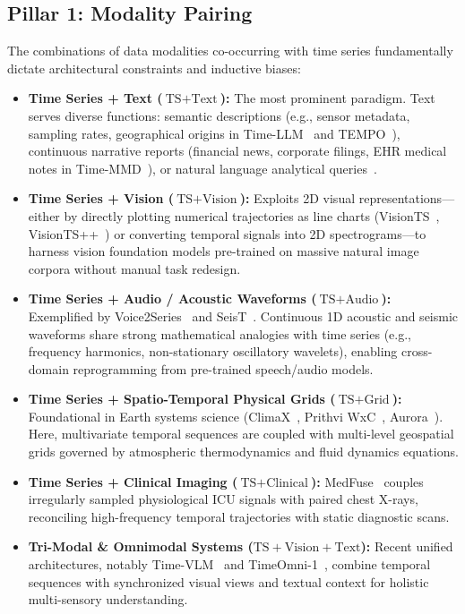 \subsection{Pillar 1: Modality Pairing}
The combinations of data modalities co-occurring with time series fundamentally dictate architectural constraints and inductive biases:
\begin{itemize}
    \item \textbf{Time Series + Text ($\text{TS} + \text{Text}$):} The most prominent paradigm. Text serves diverse functions: semantic descriptions (e.g., sensor metadata, sampling rates, geographical origins in Time-LLM~\cite{Jin2023TimeLLM} and TEMPO~\cite{Cao2023TEMPO}), continuous narrative reports (financial news, corporate filings, EHR medical notes in Time-MMD~\cite{Liu2024TimeMMD}), or natural language analytical queries~\cite{Zhao2024ChatTS,Xue2022PromptCast,Shen2025TimeMQA}.
    \item \textbf{Time Series + Vision ($\text{TS} + \text{Vision}$):} Exploits 2D visual representations—either by directly plotting numerical trajectories as line charts (VisionTS~\cite{Chen2024VisionTS}, VisionTS++~\cite{Chen2025VisionTSPlus}) or converting temporal signals into 2D spectrograms—to harness vision foundation models pre-trained on massive natural image corpora without manual task redesign.
    \item \textbf{Time Series + Audio / Acoustic Waveforms ($\text{TS} + \text{Audio}$):} Exemplified by Voice2Series~\cite{Yang2021Voice2Series} and SeisT~\cite{Zhang2024SeisT}. Continuous 1D acoustic and seismic waveforms share strong mathematical analogies with time series (e.g., frequency harmonics, non-stationary oscillatory wavelets), enabling cross-domain reprogramming from pre-trained speech/audio models.
    \item \textbf{Time Series + Spatio-Temporal Physical Grids ($\text{TS} + \text{Grid}$):} Foundational in Earth systems science (ClimaX~\cite{Nguyen2023ClimaX}, Prithvi WxC~\cite{Schmude2024PrithviWxC}, Aurora~\cite{Bodnar2024Aurora}). Here, multivariate temporal sequences are coupled with multi-level geospatial grids governed by atmospheric thermodynamics and fluid dynamics equations.
    \item \textbf{Time Series + Clinical Imaging ($\text{TS} + \text{Clinical}$):} MedFuse~\cite{Hayat2022MedFuse} couples irregularly sampled physiological ICU signals with paired chest X-rays, reconciling high-frequency temporal trajectories with static diagnostic scans.
    \item \textbf{Tri-Modal \& Omnimodal Systems ($\text{TS} + \text{Vision} + \text{Text}$):} Recent unified architectures, notably Time-VLM~\cite{Zhong2025TimeVLM} and TimeOmni-1~\cite{Tan2025TimeOmni1}, combine temporal sequences with synchronized visual views and textual context for holistic multi-sensory understanding.
\end{itemize}

